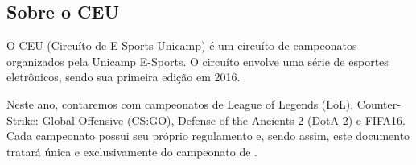 \subsection{Sobre o CEU}

O CEU (Circuíto de E-Sports Unicamp) é um circuíto de campeonatos organizados pela Unicamp E-Sports. O circuíto envolve uma série de esportes eletrônicos, sendo sua primeira edição em 2016.

Neste ano, contaremos com campeonatos de League of Legends (LoL), Counter-Strike: Global Offensive (CS:GO), Defense of the Ancients 2 (DotA 2) e FIFA16. Cada campeonato possui seu próprio regulamento e, sendo assim, este documento tratará única e exclusivamente do campeonato de \Modality.